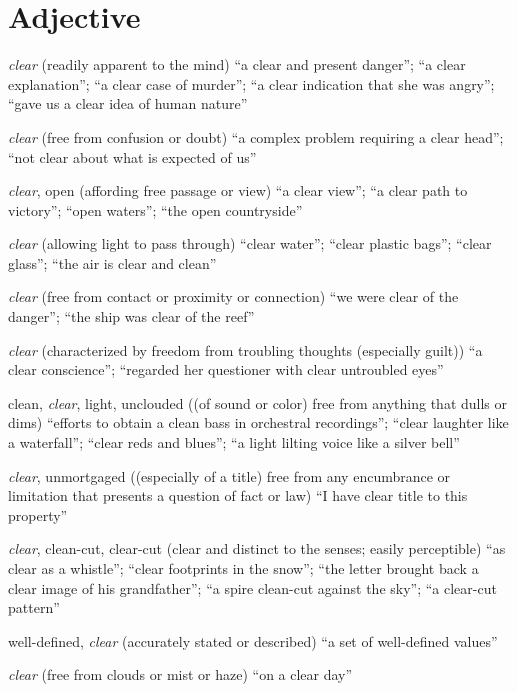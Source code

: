 \section{Adjective}
\begin{description}[leftmargin=1.9cm]
  \item [S: (adj)] \emph{clear} (readily apparent to the mind) ``a clear and present danger''; ``a clear explanation''; ``a clear case of murder''; ``a clear indication that she was angry''; ``gave us a clear idea of human nature''
  \item [S: (adj)] \emph{clear} (free from confusion or doubt) ``a complex problem requiring a clear head''; ``not clear about what is expected of us''
  \item [S: (adj)] \emph{clear}, open (affording free passage or view) ``a clear view''; ``a clear path to victory''; ``open waters''; ``the open countryside''
  \item [S: (adj)] \emph{clear} (allowing light to pass through) ``clear water''; ``clear plastic bags''; ``clear glass''; ``the air is clear and clean''
  \item [S: (adj)] \emph{clear} (free from contact or proximity or connection) ``we were clear of the danger''; ``the ship was clear of the reef''
  \item [S: (adj)] \emph{clear} (characterized by freedom from troubling thoughts (especially guilt)) ``a clear conscience''; ``regarded her questioner with clear untroubled eyes''
  \item [S: (adj)] clean, \emph{clear}, light, unclouded ((of sound or color) free from anything that dulls or dims) ``efforts to obtain a clean bass in orchestral recordings''; ``clear laughter like a waterfall''; ``clear reds and blues''; ``a light lilting voice like a silver bell''
  \item [S: (adj)] \emph{clear}, unmortgaged ((especially of a title) free from any encumbrance or limitation that presents a question of fact or law) ``I have clear title to this property''
  \item [S: (adj)] \emph{clear}, clean-cut, clear-cut (clear and distinct to the senses; easily perceptible) ``as clear as a whistle''; ``clear footprints in the snow''; ``the letter brought back a clear image of his grandfather''; ``a spire clean-cut against the sky''; ``a clear-cut pattern''
  \item [S: (adj)] well-defined, \emph{clear} (accurately stated or described) ``a set of well-defined values''
  \item [S: (adj)] \emph{clear} (free from clouds or mist or haze) ``on a clear day''

\end{description}

